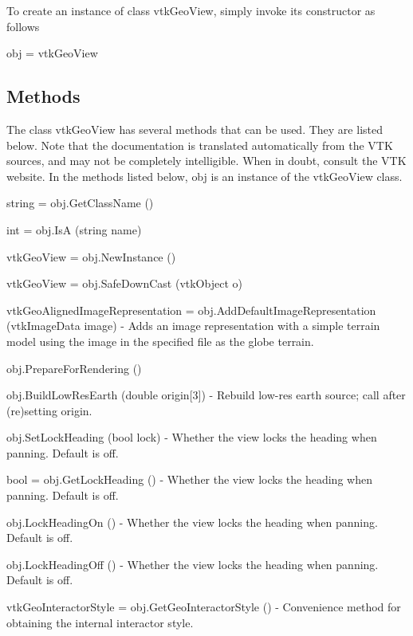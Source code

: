 To create an instance of class vtk\-Geo\-View, simply invoke its constructor as follows \begin{DoxyVerb}  obj = vtkGeoView
\end{DoxyVerb}
 \hypertarget{vtkwidgets_vtkxyplotwidget_Methods}{}\subsection{Methods}\label{vtkwidgets_vtkxyplotwidget_Methods}
The class vtk\-Geo\-View has several methods that can be used. They are listed below. Note that the documentation is translated automatically from the V\-T\-K sources, and may not be completely intelligible. When in doubt, consult the V\-T\-K website. In the methods listed below, {\ttfamily obj} is an instance of the vtk\-Geo\-View class. 
\begin{DoxyItemize}
\item {\ttfamily string = obj.\-Get\-Class\-Name ()}  
\item {\ttfamily int = obj.\-Is\-A (string name)}  
\item {\ttfamily vtk\-Geo\-View = obj.\-New\-Instance ()}  
\item {\ttfamily vtk\-Geo\-View = obj.\-Safe\-Down\-Cast (vtk\-Object o)}  
\item {\ttfamily vtk\-Geo\-Aligned\-Image\-Representation = obj.\-Add\-Default\-Image\-Representation (vtk\-Image\-Data image)} -\/ Adds an image representation with a simple terrain model using the image in the specified file as the globe terrain.  
\item {\ttfamily obj.\-Prepare\-For\-Rendering ()}  
\item {\ttfamily obj.\-Build\-Low\-Res\-Earth (double origin\mbox{[}3\mbox{]})} -\/ Rebuild low-\/res earth source; call after (re)setting origin.  
\item {\ttfamily obj.\-Set\-Lock\-Heading (bool lock)} -\/ Whether the view locks the heading when panning. Default is off.  
\item {\ttfamily bool = obj.\-Get\-Lock\-Heading ()} -\/ Whether the view locks the heading when panning. Default is off.  
\item {\ttfamily obj.\-Lock\-Heading\-On ()} -\/ Whether the view locks the heading when panning. Default is off.  
\item {\ttfamily obj.\-Lock\-Heading\-Off ()} -\/ Whether the view locks the heading when panning. Default is off.  
\item {\ttfamily vtk\-Geo\-Interactor\-Style = obj.\-Get\-Geo\-Interactor\-Style ()} -\/ Convenience method for obtaining the internal interactor style.  

\end{DoxyItemize}
